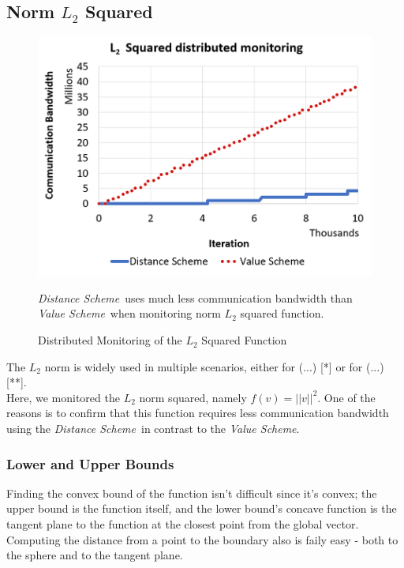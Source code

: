 \documentclass[10pt, conference]{IEEEtran}
\newcommand{\valueScheme}{\textit{Value Scheme}}
\newcommand{\distanceScheme}{\textit{Distance Scheme}}
\begin{document}
\subsection{Norm $L_2$ Squared} \label{L2SquaredExperiment}
\begin{figure}[t]
\includegraphics[width=\linewidth]{Pics/PNGs/L2NormCommunicationDiagram.png}
\caption{Distributed Monitoring of the $L_2$ Squared Function}
\medskip
\small
\distanceScheme \ uses much less communication bandwidth than \valueScheme \ when monitoring norm $L_2$ squared function.
\label{SphereMonitoring}
\end{figure} 
The $L_2$ norm is widely used in multiple scenarios, either for (...) [*] or for (...) [**]. \\
Here, we monitored the $L_2$ norm squared, namely ${f(v) = ||v||^2}$. One of the reasons is to confirm that this function requires less communication bandwidth using the \distanceScheme \ in contrast to the \valueScheme . \\
\subsubsection{Lower and Upper Bounds}
Finding the convex bound of the function isn't difficult since it's convex; the upper bound is the function itself, and the lower bound's concave function is the tangent plane to the function at the closest point from the global vector. Computing the distance from a point to the boundary also is faily easy - both to the sphere and to the tangent plane. \\
\end{document}
